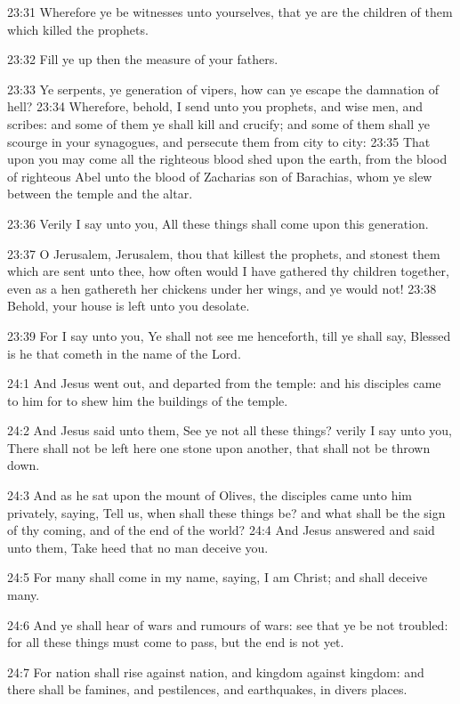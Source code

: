 23:31 Wherefore ye be witnesses unto yourselves, that ye are the
children of them which killed the prophets.

23:32 Fill ye up then the measure of your fathers.

23:33 Ye serpents, ye generation of vipers, how can ye escape the
damnation of hell?  23:34 Wherefore, behold, I send unto you prophets,
and wise men, and scribes: and some of them ye shall kill and crucify;
and some of them shall ye scourge in your synagogues, and persecute
them from city to city: 23:35 That upon you may come all the righteous
blood shed upon the earth, from the blood of righteous Abel unto the
blood of Zacharias son of Barachias, whom ye slew between the temple
and the altar.

23:36 Verily I say unto you, All these things shall come upon this
generation.

23:37 O Jerusalem, Jerusalem, thou that killest the prophets, and
stonest them which are sent unto thee, how often would I have gathered
thy children together, even as a hen gathereth her chickens under her
wings, and ye would not!  23:38 Behold, your house is left unto you
desolate.

23:39 For I say unto you, Ye shall not see me henceforth, till ye
shall say, Blessed is he that cometh in the name of the Lord.

24:1 And Jesus went out, and departed from the temple: and his
disciples came to him for to shew him the buildings of the temple.

24:2 And Jesus said unto them, See ye not all these things? verily I
say unto you, There shall not be left here one stone upon another,
that shall not be thrown down.

24:3 And as he sat upon the mount of Olives, the disciples came unto
him privately, saying, Tell us, when shall these things be? and what
shall be the sign of thy coming, and of the end of the world?  24:4
And Jesus answered and said unto them, Take heed that no man deceive
you.

24:5 For many shall come in my name, saying, I am Christ; and shall
deceive many.

24:6 And ye shall hear of wars and rumours of wars: see that ye be not
troubled: for all these things must come to pass, but the end is not
yet.

24:7 For nation shall rise against nation, and kingdom against
kingdom: and there shall be famines, and pestilences, and earthquakes,
in divers places.


